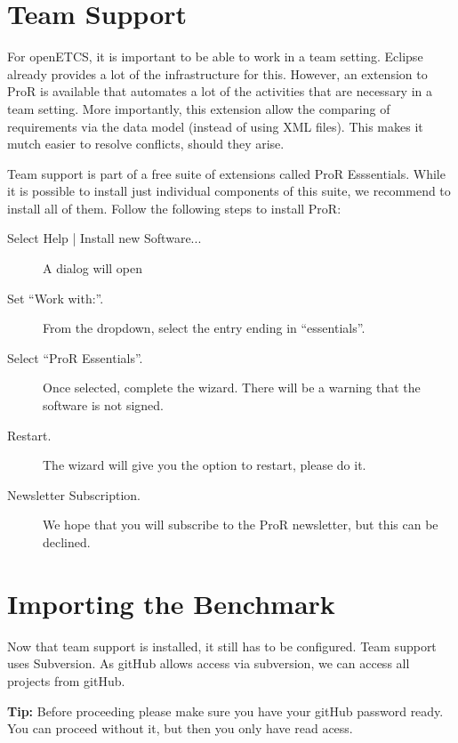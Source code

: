 \documentclass{template/openetcs_report}
\begin{document}
\section{Team Support}

For openETCS, it is important to be able to work in a team setting.  Eclipse already provides a lot of the infrastructure for this.  However, an extension to ProR is available that automates a lot of the activities that are necessary in a team setting.  More importantly, this extension allow the comparing of requirements via the data model (instead of using XML files).  This makes it mutch easier to resolve conflicts, should they arise.

Team support is part of a free suite of extensions called ProR Esssentials.  While it is possible to install just individual components of this suite, we recommend to install all of them.  Follow the following steps to install ProR:

\begin{description}

\item[Select Help | Install new Software...] A dialog will open

\item[Set ``Work with:''.]  From the dropdown, select the entry ending in ``essentials''.

\item[Select ``ProR Essentials''.]  Once selected, complete the wizard.  There will be a warning that the software is not signed.

\item[Restart.] The wizard will give you the option to restart, please do it.

\item[Newsletter Subscription.] We hope that you will subscribe to the ProR newsletter, but this can be declined.

\end{description}

\section{Importing the Benchmark}

Now that team support is installed, it still has to be configured.  Team support uses Subversion.  As gitHub allows access via subversion, we can access all projects from gitHub.

\textbf{Tip:} Before proceeding please make sure you have your gitHub password ready.  You can proceed without it, but then you only have read acess.
\end{document}
